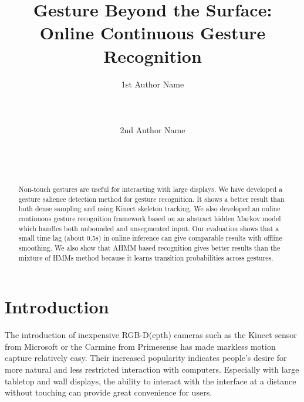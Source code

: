 \documentclass{sigchi}
\begin{document}
\title{Gesture Beyond the Surface: Online Continuous Gesture Recognition}

\author{
  \alignauthor 1st Author Name\\
    \\
    \\
    \\
  \alignauthor 2nd Author Name\\
    \\
    \\
    \\
}

\maketitle

\begin{abstract}
Non-touch gestures are useful for interacting with large displays. We have developed 
a gesture salience detection method for gesture recognition. 
It shows a better result than both dense sampling and using 
Kinect skeleton tracking. We also developed an online
continuous gesture recognition framework based on an abstract hidden Markov model
which  handles both unbounded and
unsegmented input. Our evaluation shows that a small time lag (about 0.5s) in online inference 
can give comparable results with offline
smoothing. We also show that AHMM based recognition gives better results than the mixture of HMMs method because it learns transition probabilities across gestures.

\end{abstract}



\section{Introduction}
The introduction of inexpensive RGB-D(epth) cameras such as the Kinect sensor from Microsoft or the Carmine from Primesense
has made markless motion capture relatively easy. Their increased popularity indicates people's desire for more
natural and less restricted interaction with computers. Especially with large tabletop
and wall displays, the ability to interact with the interface at a distance without touching can provide great
convenience for users.  
\end{document}
